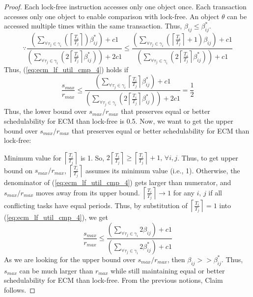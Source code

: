 \begin{proof}
Each lock-free instruction accesses only one object once. Each transaction accesses only one object to enable comparison with lock-free. An object $\theta$ can be accessed multiple times within the same transaction. Thus, $\beta_{ij} \le \beta_{ij}^*$. 
\begin{equation*}
\because
\frac{\left(\sum_{\forall\tau_{j}\in\gamma_{i}}\left(\left\lceil \frac{T_{i}}{T_{j}}\right\rceil \right)\beta_{ij}^*\right) +c1}{\left(\sum_{\forall\tau_{j}\in\gamma_{i}}\left(2\left\lceil \frac{T_{i}}{T_{j}}\right\rceil \beta_{ij}^{*}\right)\right)+2c1} \le 
\frac{\left(\sum_{\forall\tau_{j}\in\gamma_{i}}\left(\left\lceil \frac{T_{i}}{T_{j}}\right\rceil +1\right)\beta_{ij}\right)+c1}{\left(\sum_{\forall\tau_{j}\in\gamma_{i}}\left(2\left\lceil \frac{T_{i}}{T_{j}}\right\rceil \beta_{ij}^{*}\right)\right)+c1}
\end{equation*}
%
Thus, (\ref{eq:ecm_lf_util_cmp_4}) holds if 
\begin{equation*}
\frac{s_{max}}{r_{max}} \le 
\frac{\left(\sum_{\forall\tau_{j}\in\gamma_{i}}\left\lceil \frac{T_{i}}{T_{j}}\right\rceil \beta_{ij}^*\right)+c1}{\left(\sum_{\forall\tau_{j}\in\gamma_{i}}\left(2\left\lceil \frac{T_{i}}{T_{j}}\right\rceil \beta_{ij}^{*}\right)\right)+2c1} = 
\frac{1}{2}
\end{equation*}
%
Thus, the lower bound over $s_{max}/r_{max}$ that preserves equal or better schedulability for ECM than lock-free is 0.5. Now, we want to get the upper bound over $s_{max}/r_{max}$ that preserves equal or better schedulability for ECM than lock-free:

Minimum value for $\left\lceil\frac{T_i}{T_j}\right\rceil$ is 1. So, $2\left\lceil\frac{T_i}{T_j}\right\rceil \ge \left\lceil\frac{T_i}{T_j}\right\rceil+1,\,\forall i,j$. Thus, to get upper bound on $s_{max}/r_{max}$, $\left\lceil\frac{T_i}{T_j}\right\rceil$ assumes its minimum value (i.e., 1). Otherwise, the denominator of (\ref{eq:ecm_lf_util_cmp_4}) gets larger than numerator, and $s_{max}/r_{max}$ moves away from its upper bound. $\left\lceil\frac{T_i}{T_j}\right\rceil \rightarrow 1$ for any $i,\,j$ if all conflicting tasks have equal periods. Thus, by substitution of $\left\lceil\frac{T_i}{T_j}\right\rceil=1$ into (\ref{eq:ecm_lf_util_cmp_4}), we get 
%
\begin{equation}
\frac{s_{max}}{r_{max}}\le\frac{\left(\sum_{\forall\tau_{j}\in\gamma_{i}}2\beta_{ij}\right)+c1}{\left(\sum_{\forall\tau_{j}\in\gamma_{i}}2 \beta_{ij}^{*}\right)+c1}
\label{eq:ecm_lf_util_cmp_5}
\end{equation}
%
As we are looking for the upper bound over $s_{max}/r_{max}$, then $\beta_{ij} >> \beta_{ij}^*$. Thus, $s_{max}$ can be much larger than $r_{max}$ while still maintaining equal or better schedulability for ECM than lock-free. From the previous notions, Claim follows.
%
\end{proof}
%
